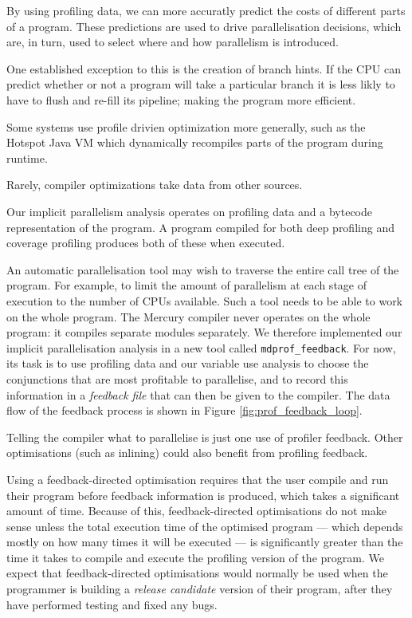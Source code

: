 By using profiling data,
we can more accuratly predict the costs of different parts of a program.
These predictions are used to drive parallelisation decisions,
which are, in turn, used to select where and how parallelism is introduced.


One established exception to this is the creation of branch hints.
If the CPU can predict whether or not a program will take a particular branch
it is less likly to have to flush and re-fill its pipeline;
making the program more efficient.

Some systems use profile drivien optimization more generally, such as the
Hotspot Java VM \citep{java-hotspot} which
dynamically recompiles parts of the program during runtime.


Rarely, compiler optimizations take data from other sources.


Our implicit parallelism analysis operates on profiling data and a
bytecode representation of the program.
A program compiled for both deep profiling and coverage profiling
produces both of these when executed.

An automatic parallelisation tool
may wish to traverse the entire call tree of the program.
For example, to limit the amount of parallelism at each stage of execution
to the number of CPUs available.
Such a tool needs to be able to work on the whole program.
The Mercury compiler never operates on the whole program:
it compiles separate modules separately.
We therefore implemented our implicit parallelisation analysis in a new tool called
\texttt{mdprof\_feedback}.
For now, its task is to use profiling data and our variable use analysis
to choose the conjunctions that are most profitable to parallelise,
and to record this information in a \emph{feedback file}
that can then be given to the compiler.
The data flow of the feedback process is shown in Figure
\ref{fig:prof_feedback_loop}.

Telling the compiler what to parallelise is just one use of profiler feedback.
Other optimisations (such as inlining) could also benefit
from profiling feedback.

Using a feedback-directed optimisation requires that the user compile
and run their program before feedback information is produced, 
which takes a significant amount of time.
Because of this, feedback-directed optimisations do not make sense
unless
the total execution time of the optimised program --- which depends
mostly on how many times it will be executed --- is significantly
greater than the time it takes to compile and execute the profiling
version of the program.
We expect that feedback-directed optimisations would normally be used
when the programmer is building a \emph{release candidate} version of their
program, after they have performed testing and fixed any bugs.

